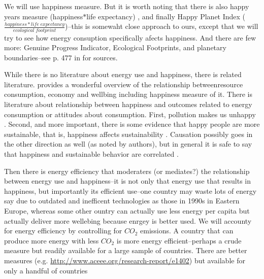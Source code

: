 \documentclass[10pt, letterpaper]{article}
\begin{document}
\begin{spacing}{1.4}
We will use happiness measure. But it is worth noting that there is also
 happy years measure (happiness$*$life expectancy) \citep{veenhoven96B}, and
 finally Happy Planet Index ($\frac{happiness*life\;expectancy}{ecological\;footprint}$)--this is somewaht close approach to  ours, except that we will try to see how energy consuption specifically afects  happiness. And there are few more: Genuine Progress Indicator, Ecological Footprints,  and planetary boundaries--see p. 477 in \citet{pretty13} for  sources. 


While there is no literature about energy use and happiness, there is related
literature. \citet{pretty13} provides a wonderful overview of the relationship
betweenresource consumption, economy and wellbing including happiness measure of
it. There is literature about relationship between happiness and outcomes
related to energy consumption or attitudes about consumption. First, pollution makes us unhappy \citep{weinhold12,welsch05}. Second,
and more important,  there is some evidence that happy people
are more sustainable, that is, happiness affects sustainability
\citep{ericson14}.  Causation possibly goes in the
other direction as well (as noted by authors), but in general it is
safe to say that happiness and sustainable behavior are correlated  \citep{brown05,corral11}.

Then there is energy efficiency that moderaters (or mediates?) the relationship
between energy use and happiness--it is not only that energy use that results in
happiness, but importantly its efficient use--one country may waste lots of
energy say due to outdated and inefficent technologies as those in 1990s in
Eastern Europe, whereas some other ountry can actually use less energy per
capita but actually deliver more wellebing because enrgey is better used. We
will accounty for  energy efficiency by controlling for  $CO_2$ emissions. 
 A country that can produce more energy with less $CO_2$ is more energy
 efficient--perhaps a crude measure but readily available for a large sample of
 countries. There are better measures (e.g. \url{http://www.aceee.org/research-report/e1402}) but available for only a handful of countries


\end{spacing}
\end{document}
